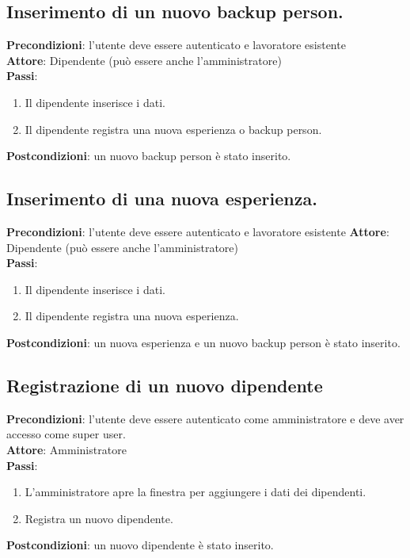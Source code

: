 \documentclass[ 4paper,11pt,openany]{book}
\begin{document}
	
\subsection{Inserimento di un nuovo backup person.}
\textbf{Precondizioni}: l'utente deve essere autenticato e lavoratore esistente\\
\textbf{Attore}: Dipendente (può essere anche l'amministratore)\\
\textbf{Passi}:
\begin{enumerate}
	\item Il dipendente inserisce i dati.
	\item Il dipendente registra una nuova esperienza o backup person.
\end{enumerate}
\textbf{Postcondizioni}: un nuovo backup person è stato inserito.
	
	
\clearpage
\subsection{Inserimento di una nuova esperienza.}
\textbf{Precondizioni}: l'utente deve essere autenticato e lavoratore esistente
\textbf{Attore}: Dipendente (può essere anche l'amministratore)\\
\textbf{Passi}:
\begin{enumerate}
	\item Il dipendente inserisce i dati.
	\item Il dipendente registra una nuova esperienza.
\end{enumerate}
\textbf{Postcondizioni}: un nuova esperienza e un nuovo backup person è stato inserito.
	
	
	
\subsection{Registrazione di un nuovo dipendente}
\textbf{Precondizioni}: l'utente deve essere autenticato come amministratore e deve aver accesso come super user.\\
\textbf{Attore}: Amministratore\\
\textbf{Passi}:
\begin{enumerate}
	\item L'amministratore apre la finestra per aggiungere i dati dei dipendenti.
	\item Registra un nuovo dipendente.
\end{enumerate}
\textbf{Postcondizioni}: un nuovo dipendente è stato inserito.
	
\end{document}
